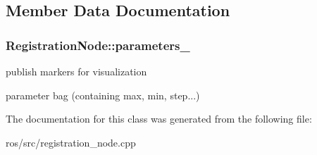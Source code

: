 \subsection{Member Data Documentation}
\hypertarget{classRegistrationNode_a64f206a310aa231161d13fd7aa54380d}{
\subsubsection[{parameters\_\-}]{ {\bf RegistrationNode::parameters\_\-}}}
\label{classRegistrationNode_a64f206a310aa231161d13fd7aa54380d}


publish markers for visualization 

parameter bag (containing max, min, step...) 

The documentation for this class was generated from the following file:\begin{DoxyCompactItemize}
\item 
ros/src/registration\_\-node.cpp\end{DoxyCompactItemize}
